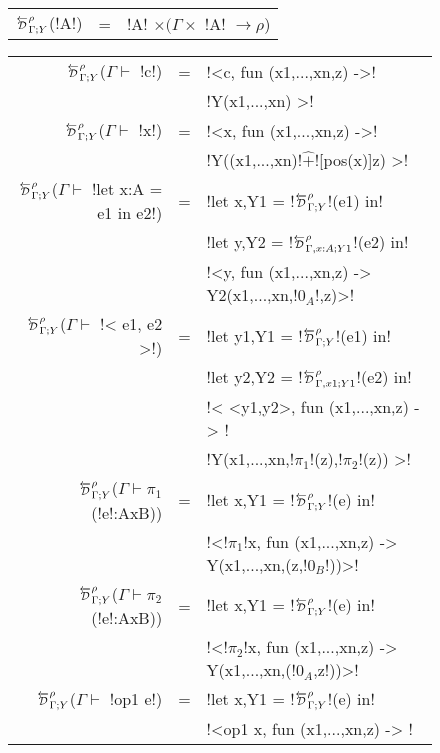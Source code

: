 \begin{figure*}[t]
    \begin{tabular}{r c l}
        $\directD{\rho}{\Gamma}{Y}$(!A!) &=&  !A! $\times (\Gamma \times$ !A! $\to \rho$)\\
    \end{tabular}
    \medskip

    \begin{tabular}{r c l}
        $\directD{\rho}{\Gamma}{Y}$($\Gamma\vdash $ !c!) &=& 
            !<c, fun (x1,...,xn,z) ->! \\
            && !Y(x1,...,xn) >!\\
        $\directD{\rho}{\Gamma}{Y}$($\Gamma\vdash $ !x!) &=& 
            !<x, fun (x1,...,xn,z) ->! \\
            && !Y((x1,...,xn)!$\widehat{+}$![pos(x)]z) >!\\
        $\directD{\rho}{\Gamma}{Y}$($\Gamma\vdash $ !let x:A = e1 in e2!) &=& 
            !let x,Y1 = !$\directD{\rho}{\Gamma}{Y}$!(e1) in! \\
            &&!let y,Y2 = !$\directD{\rho}{\Gamma,x:A}{Y1}$!(e2) in!\\ 
            &&!<y, fun (x1,...,xn,z) -> Y2(x1,...,xn,!$0_{A}$!,z)>!\\
        $\directD{\rho}{\Gamma}{Y}$($\Gamma\vdash $ !< e1, e2 >!) &=&
            !let y1,Y1 = !$\directD{\rho}{\Gamma}{Y}$!(e1) in! \\
            &&!let y2,Y2 = !$\directD{\rho}{\Gamma,x1}{Y1}$!(e2) in!\\
            &&!< <y1,y2>, fun (x1,...,xn,z) -> !\\
            &&!Y(x1,...,xn,!$\pi_1$!(z),!$\pi_2$!(z)) >!\\ 
        $\directD{\rho}{\Gamma}{Y}$($\Gamma\vdash \pi_1$(!e!:AxB)) &=&
            !let x,Y1 = !$\directD{\rho}{\Gamma}{Y}$!(e) in! \\
            && !<!$\pi_1$!x, fun (x1,...,xn,z) -> Y(x1,...,xn,(z,!$0_B$!))>! \\
        $\directD{\rho}{\Gamma}{Y}$($\Gamma\vdash \pi_2$(!e!:AxB)) &=&
            !let x,Y1 = !$\directD{\rho}{\Gamma}{Y}$!(e) in! \\
            && !<!$\pi_2$!x, fun (x1,...,xn,z) -> Y(x1,...,xn,(!$0_A$,z!))>! \\
        $\directD{\rho}{\Gamma}{Y}$($\Gamma\vdash $ !op1 e!) &=&  
            !let x,Y1 = !$\directD{\rho}{\Gamma}{Y}$!(e) in! \\
            && !<op1 x, fun (x1,...,xn,z) -> ! \\

\end{tabular}
\end{figure*}
